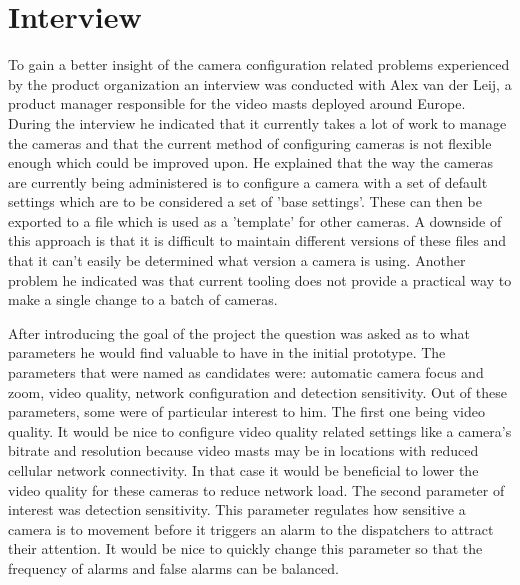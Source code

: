 
\section{Interview}
To gain a better insight of the camera configuration related problems experienced by the product organization an interview was conducted with Alex van der Leij, a product manager responsible for the video masts deployed around Europe.
During the interview he indicated that it currently takes a lot of work to manage
the cameras and that the current method of configuring cameras is not flexible enough which could be improved upon. He explained that the way the cameras are currently being
administered is to configure a camera with a set of default settings which are to be considered a set of 'base settings'. These can then be exported to a file which is used as a
'template' for other
cameras. A downside of this approach is that it is difficult to maintain different versions of these files and that it can't easily be determined what version a camera is using.
Another problem he indicated was that current tooling does not provide a practical way to make a single change to a batch of cameras.


After introducing the goal of the project the question was asked as to what parameters he would find valuable to have in the initial prototype.
The parameters that were named as candidates were: automatic camera focus and zoom, video quality, network configuration and detection sensitivity.
Out of these parameters, some were of particular interest to him. The first one being video quality. It would be nice to configure video quality related settings like a
camera's bitrate and resolution because video masts may be in locations with reduced cellular network connectivity. In that case it would be beneficial to lower the video quality
for these cameras to reduce network load. The second parameter of interest was detection sensitivity. This parameter regulates how sensitive a camera is to movement before it
triggers an alarm to the dispatchers to attract their attention. It would be nice to quickly change this parameter so that the frequency of alarms and false alarms can be balanced.



